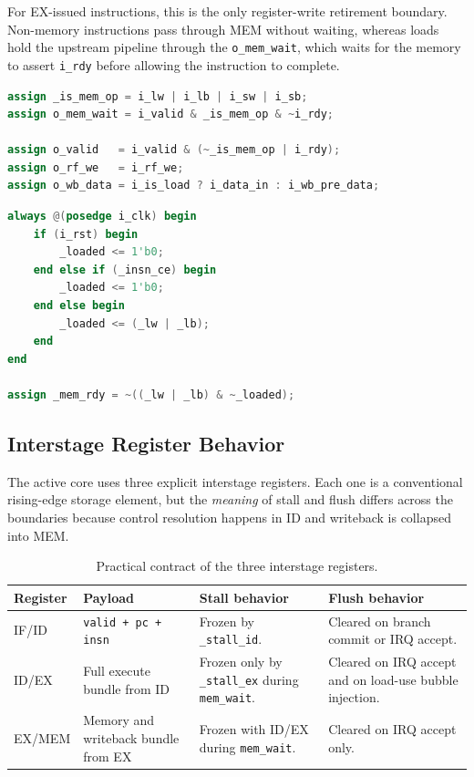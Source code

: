 \documentclass[11pt,a4paper]{article}
\begin{document}
For EX-issued instructions, this is the only register-write retirement boundary. Non-memory instructions pass through MEM without waiting, whereas loads hold the upstream pipeline through the \texttt{o\_mem\_wait}, which waits for the memory to assert \texttt{i\_rdy} before allowing the instruction to complete.

\begin{lstlisting}[language=Verilog,caption={MEM-stage handshake and writeback selection in \texttt{srcs/m\_mem\_stage.v}}]
assign _is_mem_op = i_lw | i_lb | i_sw | i_sb;
assign o_mem_wait = i_valid & _is_mem_op & ~i_rdy;

assign o_valid   = i_valid & (~_is_mem_op | i_rdy);
assign o_rf_we   = i_rf_we;
assign o_wb_data = i_is_load ? i_data_in : i_wb_pre_data;
\end{lstlisting}

\begin{lstlisting}[language=Verilog,caption={Load-ready generation in \texttt{srcs/m\_soc.v}}]
always @(posedge i_clk) begin
    if (i_rst) begin
        _loaded <= 1'b0;
    end else if (_insn_ce) begin
        _loaded <= 1'b0;
    end else begin
        _loaded <= (_lw | _lb);
    end
end

assign _mem_rdy = ~((_lw | _lb) & ~_loaded);
\end{lstlisting}

\subsection{Interstage Register Behavior}

The active core uses three explicit interstage registers. Each one is a conventional rising-edge storage element, but the \emph{meaning} of stall and flush differs across the boundaries because control resolution happens in ID and writeback is collapsed into MEM.

\begin{table}[H]
\centering
\begin{tabularx}{\linewidth}{@{}>{\ttfamily}lXXX@{}}
\toprule
Register & Payload & Stall behavior & Flush behavior \\
\midrule
IF/ID & \texttt{valid + pc + insn} & Frozen by \texttt{\_stall\_id}. & Cleared on branch commit or IRQ accept. \\
ID/EX & Full execute bundle from ID & Frozen only by \texttt{\_stall\_ex} during \texttt{mem\_wait}. & Cleared on IRQ accept and on load-use bubble injection. \\
EX/MEM & Memory and writeback bundle from EX & Frozen with ID/EX during \texttt{mem\_wait}. & Cleared on IRQ accept only. \\
\bottomrule
\end{tabularx}
\caption{Practical contract of the three interstage registers.}
\end{table}
\end{document}
